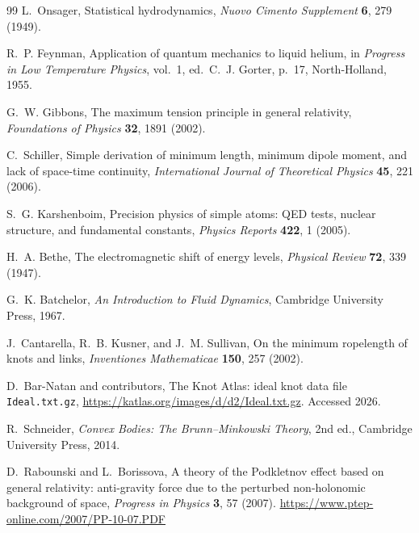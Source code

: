 \documentclass[aps,pra,preprint,longbibliography,nofootinbib]{revtex4-2}
\begin{document}
\begin{thebibliography}{99}
L.~Onsager,
Statistical hydrodynamics,
\textit{Nuovo Cimento Supplement} \textbf{6}, 279 (1949).

R.~P. Feynman,
Application of quantum mechanics to liquid helium,
in \textit{Progress in Low Temperature Physics}, vol.~1,
ed.\ C.~J. Gorter, p.~17, North-Holland, 1955.

G.~W. Gibbons,
The maximum tension principle in general relativity,
\textit{Foundations of Physics} \textbf{32}, 1891 (2002).

C.~Schiller,
Simple derivation of minimum length, minimum dipole moment, and
lack of space-time continuity,
\textit{International Journal of Theoretical Physics} \textbf{45},
221 (2006).

S.~G. Karshenboim,
Precision physics of simple atoms: QED tests, nuclear structure, and
fundamental constants,
\textit{Physics Reports} \textbf{422}, 1 (2005).

H.~A. Bethe,
The electromagnetic shift of energy levels,
\textit{Physical Review} \textbf{72}, 339 (1947).

G.~K. Batchelor,
\textit{An Introduction to Fluid Dynamics},
Cambridge University Press, 1967.


J.~Cantarella, R.~B. Kusner, and J.~M. Sullivan,
On the minimum ropelength of knots and links,
\textit{Inventiones Mathematicae} \textbf{150}, 257 (2002).

D.~Bar-Natan and contributors,
The Knot Atlas: ideal knot data file \texttt{Ideal.txt.gz},
\url{https://katlas.org/images/d/d2/Ideal.txt.gz}.
Accessed 2026.

R.~Schneider,
\textit{Convex Bodies: The Brunn--Minkowski Theory}, 2nd ed.,
Cambridge University Press, 2014.

D.~Rabounski and L.~Borissova,
A theory of the Podkletnov effect based on general relativity: anti-gravity
force due to the perturbed non-holonomic background of space,
\textit{Progress in Physics} \textbf{3}, 57 (2007).
\url{https://www.ptep-online.com/2007/PP-10-07.PDF}


\end{thebibliography}
\end{document}
